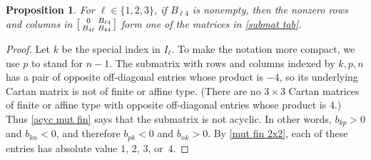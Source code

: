 \documentclass{amsart}
\newtheorem{proposition}{Proposition}[section]
\theoremstyle{definition}
\theoremstyle{remark}
\numberwithin{equation}{section}
\newcommand{\set}[1]{{\lbrace #1 \rbrace}}
\newcommand{\0}{{\mathbf{0}}}
\begin{document}
\begin{proposition}\label{3x3 submat}
For $\ell\in\set{1,2,3}$, if $B_{\ell4}$ is nonempty, then the nonzero rows and columns in $\begin{bsmallmatrix} 0 & B_{\ell4} \\ B_{4\ell} & B_{44} \end{bsmallmatrix}$ form one of the matrices in \cref{submat tab}.
\end{proposition}
\begin{proof}
Let $k$ be the special index in $I_\ell$.
To make the notation more compact, we use $p$ to stand for $n-1$.
The submatrix with rows and columns indexed by $k,p,n$ has a pair of opposite off-diagonal entries whose product is $-4$, so its underlying Cartan matrix is not of finite or affine type.
(There are no $3\times3$ Cartan matrices of finite or affine type with opposite off-diagonal entries whose product is $4$.)
Thus \cref{acyc mut fin} says that the submatrix is not acyclic.
In other words, $b_{kp}>0$ and $b_{kn}<0$, and therefore $b_{pk}<0$ and $b_{nk}>0$.
By \cref{mut fin 2x2}, each of these entries has absolute value $1$, $2$, $3$, or~$4$.


\end{proof}
\end{document}
